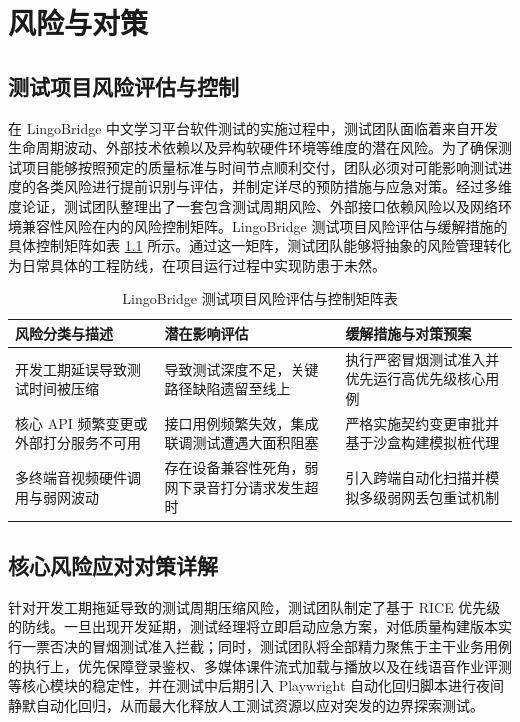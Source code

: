 \chapter{风险与对策}

\section{测试项目风险评估与控制}

在 LingoBridge 中文学习平台软件测试的实施过程中，测试团队面临着来自开发生命周期波动、外部技术依赖以及异构软硬件环境等维度的潜在风险。为了确保测试项目能够按照预定的质量标准与时间节点顺利交付，团队必须对可能影响测试进度的各类风险进行提前识别与评估，并制定详尽的预防措施与应急对策。经过多维度论证，测试团队整理出了一套包含测试周期风险、外部接口依赖风险以及网络环境兼容性风险在内的风险控制矩阵。LingoBridge 测试项目风险评估与缓解措施的具体控制矩阵如表 \ref{tab:test-risks} 所示。通过这一矩阵，测试团队能够将抽象的风险管理转化为日常具体的工程防线，在项目运行过程中实现防患于未然。

\begin{table}[htbp]
  \centering
  \caption{LingoBridge 测试项目风险评估与控制矩阵表}
  \label{tab:test-risks}
  \begin{tabularx}{\textwidth}{lXX}
    \toprule
    风险分类与描述 & 潜在影响评估 & 缓解措施与对策预案 \\
    \midrule
    开发工期延误导致测试时间被压缩 & 导致测试深度不足，关键路径缺陷遗留至线上 & 执行严密冒烟测试准入并优先运行高优先级核心用例 \\
    核心 API 频繁变更或外部打分服务不可用 & 接口用例频繁失效，集成联调测试遭遇大面积阻塞 & 严格实施契约变更审批并基于沙盒构建模拟桩代理 \\
    多终端音视频硬件调用与弱网波动 & 存在设备兼容性死角，弱网下录音打分请求发生超时 & 引入跨端自动化扫描并模拟多级弱网丢包重试机制 \\
    \bottomrule
  \end{tabularx}
\end{table}

\section{核心风险应对对策详解}

针对开发工期拖延导致的测试周期压缩风险，测试团队制定了基于 RICE 优先级的防线。一旦出现开发延期，测试经理将立即启动应急方案，对低质量构建版本实行一票否决的冒烟测试准入拦截；同时，测试团队将全部精力聚焦于主干业务用例的执行上，优先保障登录鉴权、多媒体课件流式加载与播放以及在线语音作业评测等核心模块的稳定性，并在测试中后期引入 Playwright 自动化回归脚本进行夜间静默自动化回归，从而最大化释放人工测试资源以应对突发的边界探索测试。

